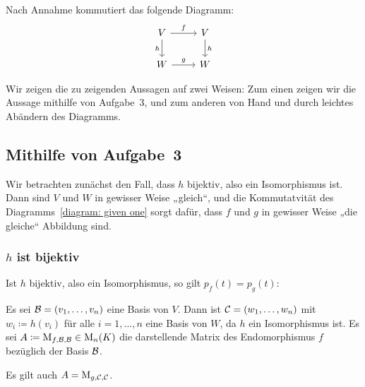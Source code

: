 \section{}

Nach Annahme kommutiert das folgende Diagramm:
\begin{equation}
  \label{diagram: given one}
  \begin{tikzcd}
      V
      \arrow{r}{f}
      \arrow[swap]{d}{h}
    & V
      \arrow{d}{h}
    \\
      W
      \arrow{r}{g}
    & W
  \end{tikzcd}
\end{equation}

Wir zeigen die zu zeigenden Aussagen auf zwei Weisen:
Zum einen zeigen wir die Aussage mithilfe von Aufgabe~3, und zum anderen von Hand und durch leichtes Abändern des Diagramms.





\subsection*{Mithilfe von Aufgabe~3}

Wir betrachten zunächst den Fall, dass $h$ bijektiv, also ein Isomorphismus ist.
Dann sind $V$ und $W$ in gewisser Weise „gleich“, und die Kommutatvität des Diagramms~\eqref{diagram: given one} sorgt dafür, dass $f$ und $g$ in gewisser Weise „die gleiche“ Abbildung sind.


\subsubsection*{$h$ ist bijektiv}

Ist $h$ bijektiv, also ein Isomorphismus, so gilt $p_f(t) = p_g(t)$:

Es sei $\mathcal{B} = (v_1, \dotsc, v_n)$ eine Basis von $V$.
Dann ist $\mathcal{C} = (w_1, \dotsc, w_n)$ mit $w_i \coloneqq h(v_i)$ für alle $i = 1, \dotsc, n$ eine Basis von $W$, da $h$ ein Isomorphismus ist.
Es sei $A \coloneqq \operatorname{M}_{f, \mathcal{B}, \mathcal{B}} \in \operatorname{M}_{n}(K)$ die darstellende Matrix des Endomorphismus $f$ bezüglich der Basis $\mathcal{B}$.

\begin{claim}
  Es gilt auch $A = \operatorname{M}_{g, \mathcal{C}, \mathcal{C}}$.
\end{claim}

